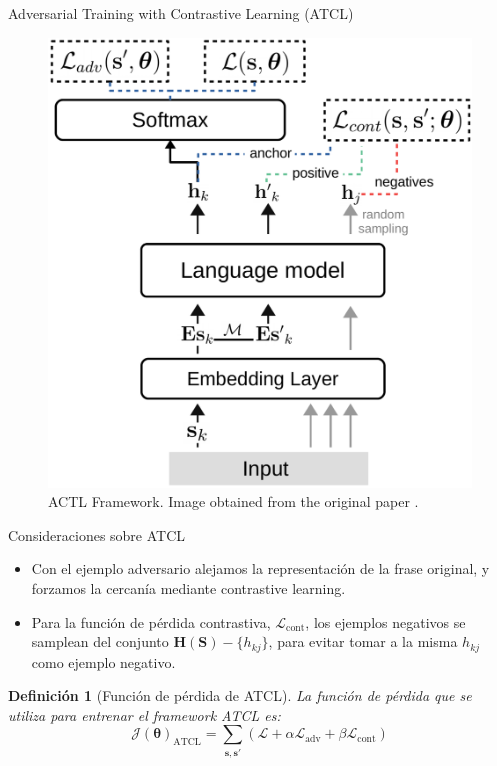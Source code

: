 \documentclass[aspectratio=169]{beamer}
\newtheorem{defi}{Definición}
\begin{document}
  \begin{frame}{Adversarial Training with Contrastive Learning (ATCL)}

    \begin{figure}
    \centering
    \includegraphics[scale=0.3]{embed}
    \caption{ACTL Framework. Image obtained from the original paper \citep{DBLP:journals/corr/abs-2109-09075}.}
    \end{figure}
  \end{frame}

  \begin{frame}{Consideraciones sobre ATCL}

    
    \begin{itemize}
      \item Con el ejemplo adversario alejamos la representación de la frase original, y forzamos la cercanía mediante contrastive learning.
      
      \item Para la función de pérdida contrastiva, \(\mathcal L_{\text{cont}}\), los ejemplos negativos se samplean del conjunto \(\mathbf{H(S)} - \{h_{kj}\}\), para evitar tomar a la misma \(h_{kj}\) como ejemplo negativo.
    \end{itemize}

    \begin{defi}[Función de pérdida de ATCL]
      La función de pérdida que se utiliza para entrenar el framework ATCL es:
      \[
      \mathcal J(\mathbf \theta)_{\text{ATCL}} = \sum_{\mathbf{s},\mathbf{s'}} \left( \mathcal L + \alpha \mathcal L_{\text{adv}} + \beta \mathcal L_{\text{cont}}\right)  
      \]
    \end{defi}

    \end{frame}
\end{document}
